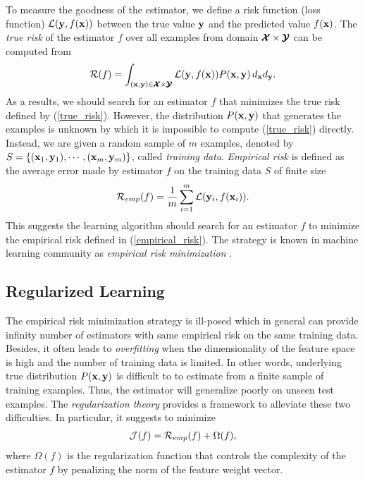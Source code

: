 To measure the goodness of the estimator, we define a risk function (loss function) $\mathcal{L}(\mathbf {y},f(\mathbf {x}))$ between the true value $\mathbf {y}$ and the predicted value $f(\mathbf {x})$.
The \textit{true risk} of the estimator $f$ over all examples from domain $\pmb {\mathcal{X}}\times\pmb {\mathcal{Y}}$ can be computed from
\begin{align}
	\mathcal{R}(f) = \int_{(\mathbf {x},\mathbf {y})\in\pmb {\mathcal{X}}\times\pmb {\mathcal{Y}}}\mathcal{L}(\mathbf {y},f(\mathbf {x}))P(\mathbf {x},\mathbf {y})\,d_{\mathbf {x}}d_{\mathbf {y}} \label{true_risk}.
\end{align}
As a results, we should search for an estimator $f$ that minimizes the true risk defined by (\ref{true_risk}).
However, the distribution $P(\mathbf {x},\mathbf {y})$ that generates the examples is unknown by which it is impossible to compute (\ref{true_risk}) directly.
Instead, we are given a random sample of $m$ examples, denoted by $S=\{(\mathbf {x}_1,\mathbf {y}_1),\cdots,(\mathbf {x}_m,\mathbf {y}_m)\}$, called \textit{training data}.
\textit{Empirical risk} is defined as the average error made by estimator $f$ on the training data $S$ of finite size
\begin{align}
	\mathcal{R}_{emp}(f) = \frac{1}{m}\sum_{i=1}^{m}\mathcal{L}(\mathbf {y}_i,f(\mathbf {x}_i)) \label{empirical_risk}.
\end{align}
This suggests the learning algorithm should search for an estimator $f$ to minimize the empirical risk defined in (\ref{empirical_risk}).
The strategy is known in machine learning community as \textit{empirical risk minimization} \citep{Vapnik92principles}.

\subsection{Regularized Learning}\label{sc_rl}

The empirical risk minimization strategy is ill-posed which in general can provide infinity number of estimators with same empirical risk on the same training data.
Besides, it often leads to \textit{overfitting} when the dimensionality of the feature space is high and the number of training data is limited.
In other words, underlying true distribution $P(\mathbf {x},\mathbf {y})$ is difficult to to estimate from a finite sample of training examples.
Thus, the estimator will generalize poorly on unseen test examples.
The \textit{regularization theory} provides a framework to alleviate these two difficulties.
In particular, it suggests to minimize 
 \begin{align*}
	\mathcal{J}(f) = \mathcal{R}_{emp}(f) + \Omega(f),
\end{align*}
where $\Omega(f)$ is the regularization function that controls the complexity of the estimator $f$ by penalizing the norm of the feature weight vector.

